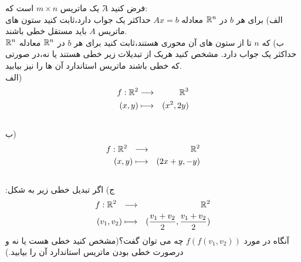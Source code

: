 \documentclass{article}
\begin{document}
  فرض کنید 
 $ََA$
یک ماتریس 
$m\times n$
است که:
\\
الف) برای هر $b$  در 
${\Bbb R}^n$
 معادله 
 $Ax=b$
 حداکثر یک جواب دارد،ثابت کنید ستون های ماتریس 
 $A$
 باید مستقل خطی باشند.
 \\
 ب) که $n$ تا از ستون های آن محوری هستند،ثابت کنید برای هر $b$  در 
 ${\Bbb R}^n$
 معادله ${\Bbb R}^n$ حداکثر یک جواب دارد.
 \newpage
  مشخص کنید هریک از تبدیلات زیر خطی هستند یا نه،در صورتی که خطی باشند ماتریس استاندارد آن ها را نیز بیابید.\\
 الف)
 {\setlength\arraycolsep{0.1em}
 \begin{eqnarray*}
 	f:{\Bbb R}^2&\longrightarrow& {\Bbb R}^3\\
 	 (x,y)&\longmapsto&(x^2,2y)
 \end{eqnarray*}}
\\
ب) 
{\setlength\arraycolsep{0.1em}
	\begin{eqnarray*}
		f:{\Bbb R}^2\ \ &\longrightarrow&\ \ {\Bbb R}^2\\
		(x,y)&\longmapsto&(2x+y,-y)
\end{eqnarray*}}\\
ج) اگر تبدیل خطی زیر به شکل:
{\setlength\arraycolsep{0.1em}
	\begin{eqnarray*}
		f:{\Bbb R}^2\ \ &\longrightarrow&\ \ {\Bbb R}^2\\
		(v_1,v_2)&\longmapsto&(\frac{v_1+v_2}{2},\frac{v_1+v_2}{2})
\end{eqnarray*}}
آنگاه در مورد 
$f(f(v_1,v_2))$
چه می توان گفت؟(مشخص کنید خطی هست یا نه و درصورت خطی بودن ماتریس استاندارد آن را بیابید.)
\end{document}

